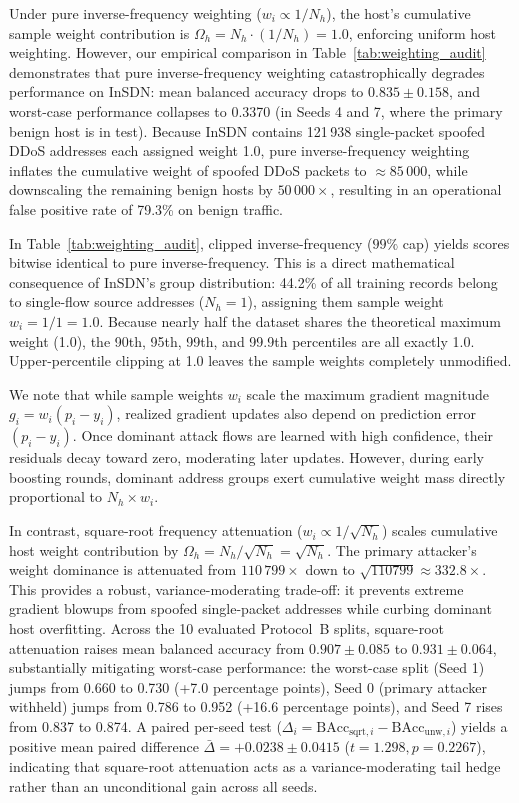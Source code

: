 \documentclass[journal]{IEEEtran}
\begin{document}
Under pure inverse-frequency weighting ($w_i \propto 1/N_h$), the host's cumulative sample weight contribution is $\Omega_h = N_h \cdot (1/N_h) = 1.0$, enforcing uniform host weighting. However, our empirical comparison in Table~\ref{tab:weighting_audit} demonstrates that pure inverse-frequency weighting catastrophically degrades performance on InSDN: mean balanced accuracy drops to $0.835\pm0.158$, and worst-case performance collapses to 0.3370 (in Seeds 4 and 7, where the primary benign host is in test). Because InSDN contains 121\,938 single-packet spoofed DDoS addresses each assigned weight 1.0, pure inverse-frequency weighting inflates the cumulative weight of spoofed DDoS packets to $\approx 85\,000$, while downscaling the remaining benign hosts by $50\,000\times$, resulting in an operational false positive rate of 79.3\% on benign traffic.

In Table~\ref{tab:weighting_audit}, clipped inverse-frequency ($99\%$ cap) yields scores bitwise identical to pure inverse-frequency. This is a direct mathematical consequence of InSDN's group distribution: 44.2\% of all training records belong to single-flow source addresses ($N_h = 1$), assigning them sample weight $w_i = 1/1 = 1.0$. Because nearly half the dataset shares the theoretical maximum weight (1.0), the 90th, 95th, 99th, and 99.9th percentiles are all exactly 1.0. Upper-percentile clipping at 1.0 leaves the sample weights completely unmodified.

We note that while sample weights $w_i$ scale the maximum gradient magnitude $g_i = w_i (p_i - y_i)$, realized gradient updates also depend on prediction error $(p_i - y_i)$. Once dominant attack flows are learned with high confidence, their residuals decay toward zero, moderating later updates. However, during early boosting rounds, dominant address groups exert cumulative weight mass directly proportional to $N_h \times w_i$.



In contrast, square-root frequency attenuation ($w_i \propto 1 / \sqrt{N_h}$) scales cumulative host weight contribution by $\Omega_h = N_h / \sqrt{N_h} = \sqrt{N_h}$. The primary attacker's weight dominance is attenuated from $110\,799\times$ down to $\sqrt{110799} \approx 332.8\times$. This provides a robust, variance-moderating trade-off: it prevents extreme gradient blowups from spoofed single-packet addresses while curbing dominant host overfitting. Across the 10 evaluated Protocol~B splits, square-root attenuation raises mean balanced accuracy from $0.907\pm0.085$ to $0.931\pm0.064$, substantially mitigating worst-case performance: the worst-case split (Seed 1) jumps from 0.660 to 0.730 (+7.0 percentage points), Seed 0 (primary attacker withheld) jumps from 0.786 to 0.952 (+16.6 percentage points), and Seed 7 rises from 0.837 to 0.874. A paired per-seed test ($\Delta_i = \text{BAcc}_{\text{sqrt}, i} - \text{BAcc}_{\text{unw}, i}$) yields a positive mean paired difference $\bar{\Delta} = +0.0238 \pm 0.0415$ ($t = 1.298, p = 0.2267$), indicating that square-root attenuation acts as a variance-moderating tail hedge rather than an unconditional gain across all seeds.
\end{document}
